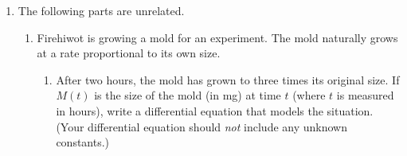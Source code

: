 \documentclass{article}
\begin{document}
\begin{enumerate}
\begin{enumerate}
\begin{solution}
      Let's use the First Derivative Test to see if this is really a
      maximum.  We test points to get the following sign chart:
      \begin{center}
      \end{center}
      For example, $A'(1) = \frac{29}{26 \cdot 37} > 0$ and $A'(10) =
      \frac{-70}{125 \cdot 136} < 0$.  So, $x = \sqrt{30}$ indeed gives
      the maximum angle, and Fran\c{cois} should stand  to get the maximum viewing angle.
    \end{solution}

  \end{enumerate}

\item 

  
  The following parts are unrelated.

  \begin{enumerate}
  
  \item 

    Firehiwot is growing a mold for an experiment.  The mold naturally
    grows at a rate proportional to its own size.  
    \begin{enumerate}
    \item

      \begin{problem}[\vfill]
        After two hours, the mold has grown to three times its original
        size.  If $M(t)$ is the size of the mold (in mg) at time $t$
        (where $t$ is measured in hours), write a differential equation
        that models the situation.  (Your differential equation should
        \emph{not} include any unknown constants.) 
      \end{problem}


\end{enumerate}
\end{enumerate}
\end{enumerate}
\end{document}
